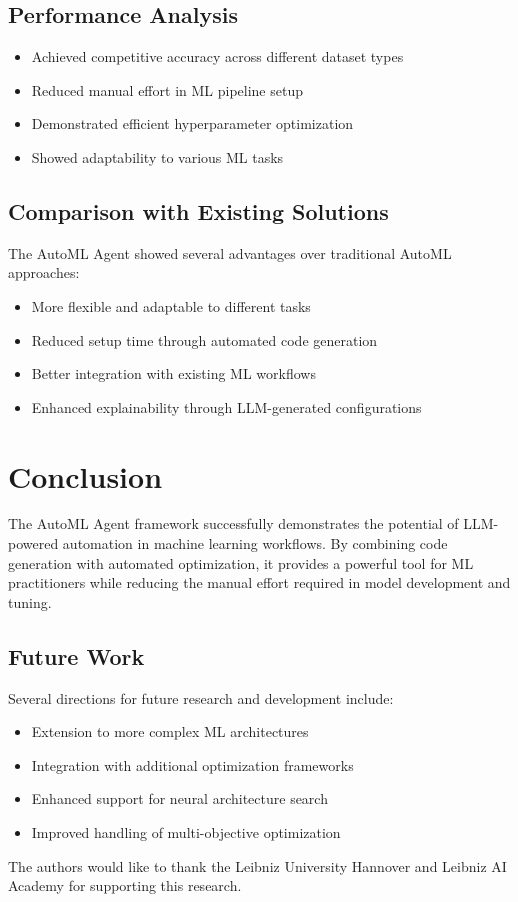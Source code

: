 \documentclass[11pt]{article}
\begin{document}
\subsection{Performance Analysis}
\begin{itemize}
    \item Achieved competitive accuracy across different dataset types
    \item Reduced manual effort in ML pipeline setup
    \item Demonstrated efficient hyperparameter optimization
    \item Showed adaptability to various ML tasks
\end{itemize}

\subsection{Comparison with Existing Solutions}
The AutoML Agent showed several advantages over traditional AutoML approaches:
\begin{itemize}
    \item More flexible and adaptable to different tasks
    \item Reduced setup time through automated code generation
    \item Better integration with existing ML workflows
    \item Enhanced explainability through LLM-generated configurations
\end{itemize}

\section{Conclusion}
The AutoML Agent framework successfully demonstrates the potential of LLM-powered automation in machine learning workflows. By combining code generation with automated optimization, it provides a powerful tool for ML practitioners while reducing the manual effort required in model development and tuning.

\subsection{Future Work}
Several directions for future research and development include:
\begin{itemize}
    \item Extension to more complex ML architectures
    \item Integration with additional optimization frameworks
    \item Enhanced support for neural architecture search
    \item Improved handling of multi-objective optimization
\end{itemize}

\begin{acknowledgements}
The authors would like to thank the Leibniz University Hannover and Leibniz AI Academy for supporting this research.
\end{acknowledgements}


\end{document}
